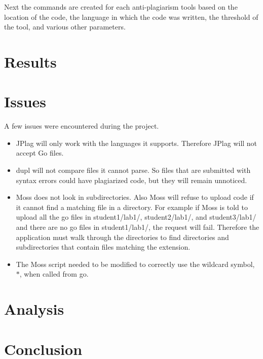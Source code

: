 \documentclass[12pt]{article}
\begin{document}
			Next the commands are created for each anti-plagiarism tools based on the location of the code, the language in which the code was written, the threshold of the tool, and various other parameters.
			
	\section{Results}
	\section{Issues}
		A few issues were encountered during the project.
		\begin{itemize}
			\item JPlag will only work with the languages it supports. Therefore JPlag will not accept Go files. 
			\item dupl will not compare files it cannot parse. So files that are submitted with syntax errors could have plagiarized code, but they will remain unnoticed.
			\item Moss does not look in subdirectories. Also Moss will refuse to upload code if it cannot find a matching file in a directory. For example if Moss is told
			to upload all the go files in student1/lab1/, student2/lab1/, and student3/lab1/ and there are no go files in student1/lab1/, the request will fail. Therefore
			the application must walk through the directories to find directories and subdirectories that contain files matching the extension.
			\item The Moss script needed to be modified to correctly use the wildcard symbol, $*$, when called from go.
		\end{itemize}
	\section{Analysis}
	\section{Conclusion}
	
	
\end{document}
